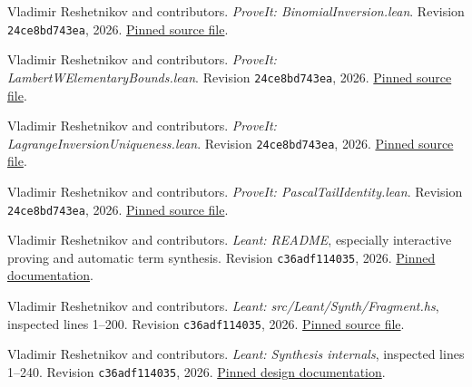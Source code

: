 \documentclass[11pt,a4paper]{article}
\newcommand{\Pcommit}{\texttt{24ce8bd743ea}}
\newcommand{\Lcommit}{\texttt{c36adf114035}}
\newcommand{\source}[2]{\href{#1}{#2}}
\begin{document}
\clearpage
{}
\begin{thebibliography}{99}
\setlength{\itemsep}{5pt}

Vladimir Reshetnikov and contributors.
\emph{ProveIt: BinomialInversion.lean}.
Revision \Pcommit, 2026.
\source{https://github.com/VladimirReshetnikov/ProveIt/blob/24ce8bd743eaab64a91ce90725ea00f498d319d2/Analysis/FabiusFunction/Lean/FabiusFunction/BinomialInversion.lean}{Pinned source file}.

Vladimir Reshetnikov and contributors.
\emph{ProveIt: LambertWElementaryBounds.lean}.
Revision \Pcommit, 2026.
\source{https://github.com/VladimirReshetnikov/ProveIt/blob/24ce8bd743eaab64a91ce90725ea00f498d319d2/Analysis/FabiusFunction/Lean/FabiusFunction/LambertWElementaryBounds.lean}{Pinned source file}.

Vladimir Reshetnikov and contributors.
\emph{ProveIt: LagrangeInversionUniqueness.lean}.
Revision \Pcommit, 2026.
\source{https://github.com/VladimirReshetnikov/ProveIt/blob/24ce8bd743eaab64a91ce90725ea00f498d319d2/Analysis/FabiusFunction/Lean/FabiusFunction/LagrangeInversionUniqueness.lean}{Pinned source file}.

Vladimir Reshetnikov and contributors.
\emph{ProveIt: PascalTailIdentity.lean}.
Revision \Pcommit, 2026.
\source{https://github.com/VladimirReshetnikov/ProveIt/blob/24ce8bd743eaab64a91ce90725ea00f498d319d2/Analysis/FabiusFunction/Lean/FabiusFunction/PascalTailIdentity.lean}{Pinned source file}.

Vladimir Reshetnikov and contributors.
\emph{Leant: README}, especially interactive proving and automatic term synthesis.
Revision \Lcommit, 2026.
\source{https://github.com/VladimirReshetnikov/Leant/blob/c36adf114035fb2fba6c276b63944cc613b31668/README.md}{Pinned documentation}.

Vladimir Reshetnikov and contributors.
\emph{Leant: src/Leant/Synth/Fragment.hs}, inspected lines 1--200.
Revision \Lcommit, 2026.
\source{https://github.com/VladimirReshetnikov/Leant/blob/c36adf114035fb2fba6c276b63944cc613b31668/src/Leant/Synth/Fragment.hs}{Pinned source file}.

Vladimir Reshetnikov and contributors.
\emph{Leant: Synthesis internals}, inspected lines 1--240.
Revision \Lcommit, 2026.
\source{https://github.com/VladimirReshetnikov/Leant/blob/c36adf114035fb2fba6c276b63944cc613b31668/docs/synth-internals.md}{Pinned design documentation}.


\end{thebibliography}
\end{document}
